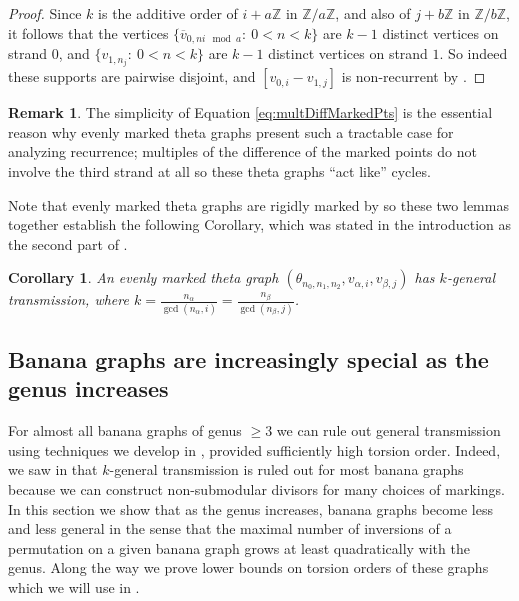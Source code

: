 \documentclass[11pt]{article}
\newtheorem{coro}[theo]{Corollary}
\theoremstyle{definition}
\newtheorem{rema}[theo]{Remark}
\numberwithin{equation}{section}
\newcommand{\Z}{\mathbb{Z}}
\begin{document}
\begin{proof}
Since $k$ is the additive order of $i + a \Z$ in $\Z / a \Z$, and also of $j + b \Z$ in $\Z / b \Z$, it follows that the vertices $\{ \overline{v}_{0, ni \mod a}:\ 0 < n < k \}$ are $k-1$ distinct vertices on strand $0$, and $\{ v_{1,n_j}:\ 0 < n < k \}$ are $k-1$ distinct vertices on strand $1$. So indeed these supports are pairwise disjoint, and $[v_{0,i} - v_{1,j}]$ is non-recurrent by .
\end{proof}

\begin{rema}
The simplicity of Equation \eqref{eq:multDiffMarkedPts} is the essential reason why evenly marked theta graphs present such a tractable case for analyzing recurrence; multiples of the difference of the marked points do not involve the third strand at all so these theta graphs ``act like'' cycles.
\end{rema}

Note that evenly marked theta graphs are rigidly marked by  so these two lemmas together establish the following Corollary, which was stated in the introduction as the second part of .

\begin{coro}\label{cor:evenlyMarkedKGT}
An evenly marked theta graph $(\theta_{n_0,n_1,n_2}, v_{\alpha,i}, v_{\beta,j})$  has $k$-general transmission, where $k = \frac{n_\alpha}{\gcd(n_\alpha, i)} = \frac{n_\beta}{\gcd(n_\beta, j)} $.
\end{coro}



\subsection{Banana graphs are increasingly special as the genus increases}\label{ssec:mostBananas}

For almost all banana graphs of genus $\geq 3$ we can rule out general transmission using techniques we develop in , provided sufficiently high torsion order. Indeed, we saw in  that $k$-general transmission is ruled out for most banana graphs because we can construct non-submodular divisors for many choices of markings.  In this section we show that as the genus increases, banana graphs become less and less general in the sense that the maximal number of inversions of a permutation on a given banana graph grows at least quadratically with the genus. Along the way we prove lower bounds on torsion orders of these graphs which we will use in .
\end{document}
